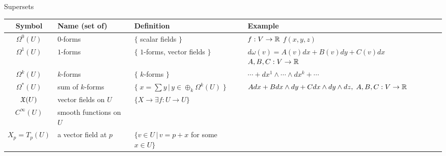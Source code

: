 \documentclass[10pt,a4paper]{report}
\begin{document}
Supersets \\

\begin{tabular}{|c|l|l|p{6cm}|}
	\hline
	Symbol & Name (set of) & Definition & Example \\
	\hline
	$\Omega^0(U)$ & $0$-forms & $\{ $ scalar fields  $\}$ & $f: V \to \mathbb{R}$ $f(x,y,z)$\\
	\hline
	$\Omega^1(U)$ & $1$-forms & $\{$ $ 1$-forms, vector fields $\}$ & $d\omega(v) = A(v)dx+B(v)dy+C(v)dx$ $A,B,C: V \to \mathbb{R}$\\
	\hline
	$\Omega^k(U)$ & $k$-forms & $\{$ $ k$-forms $\}$ & $\cdots + dx^1 \wedge \cdots \wedge dx^k + \cdots$ \\
	\hline
	$\Omega^*(U)$ & sum of $k$-forms & $\{\;x=\sum y\,|\, y\in \oplus_k \Omega^k(U) \;\}$ & $ Adx + Bdx \wedge dy + Cdx \wedge dy \wedge dz,\; A,B,C : V \to \mathbb{R}$\\
	\hline
	$\mathfrak{X}(U)$ & vector fields on $U$ & $\{ X \to \exists f:U\to U\}$&\\
	\hline
	$C^\infty(U)$ & smooth functions on $U$ & &\\
	\hline
	$X_p = T_p(U)$ & a vector field at $p$ & $\{ v \in U \,|\, v = p + x$ for some $x \in U\}$&\\
	\hline
\end{tabular}\\
\end{document}
